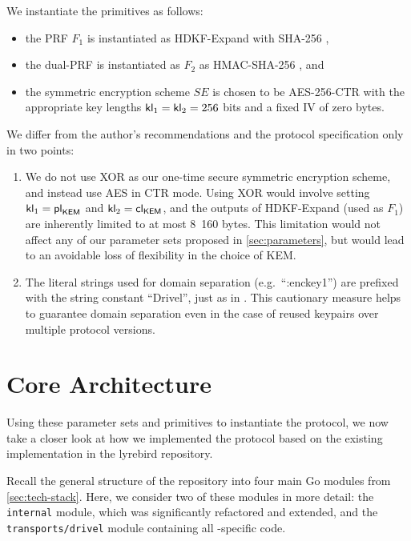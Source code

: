 We instantiate the primitives as follows:
\begin{itemize}
    \item the PRF $F_1$ is instantiated as \textsf{HDKF-Expand} with \textsf{SHA-256} \cite{C:Krawczyk10,rfc5869},
    
    \item the dual-PRF is instantiated as $F_2$ as \textsf{HMAC-SHA-256} \cite{C:BelCanKra96,KraBelCan97}, and
    
    \item the symmetric encryption scheme $SE$ is chosen to be \textsf{AES-256-CTR} with the appropriate key lengths $\mathsf{kl}_1 = \mathsf{kl}_2 = 256$ bits and a fixed IV of zero bytes.
\end{itemize}

We differ from the author's recommendations and the protocol specification only in two points:
\begin{enumerate}
    \item We do not use XOR as our one-time secure symmetric encryption scheme, and instead use AES in CTR mode. Using XOR would involve setting $\mathsf{kl}_1 = {\mathsf{pl}_{\mathsf{KEM}}}$ and $\mathsf{kl}_2 = {\mathsf{cl}_{\mathsf{KEM}}}$, and the outputs of \textsf{HDKF-Expand} (used as $F_1$) are inherently limited to at most 8~160 bytes. This limitation would not affect any of our parameter sets proposed in \cref{sec:parameters}, but would lead to an avoidable loss of flexibility in the choice of KEM.

    \item The literal strings used for domain separation (e.g.~``:enckey1'') are prefixed with the string constant ``Drivel'', just as in \obfsfour{}. This cautionary measure helps to guarantee domain separation even in the case of reused keypairs over multiple protocol versions.
\end{enumerate}

\section{Core Architecture} \label{sec:impl-architecture}

Using these parameter sets and primitives to instantiate the \drivel{} protocol, we now take a closer look at how we implemented the \drivel{} protocol based on the existing \obfsfour{} implementation in the lyrebird repository.

Recall the general structure of the repository into four main Go modules from \cref{sec:tech-stack}. Here, we consider two of these modules in more detail: the \texttt{internal} module, which was significantly refactored and extended, and the \texttt{transports/drivel} module containing all \drivel{}-specific code.

